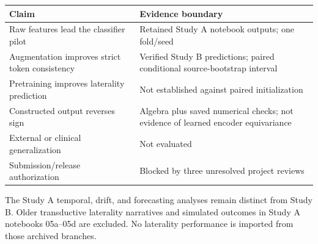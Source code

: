 \documentclass{article}
\begin{document}
{\def\LTcaptype{none} %
\begin{longtable}[]{@{}
  >{\raggedright\arraybackslash}p{}
  >{\raggedright\arraybackslash}p{}@{}}
\toprule\noalign{}
\begin{minipage}[b]{\linewidth}\raggedright
Claim
\end{minipage} & \begin{minipage}[b]{\linewidth}\raggedright
Evidence boundary
\end{minipage} \\
\midrule\noalign{}
\endhead
\bottomrule\noalign{}
\endlastfoot
Raw features lead the classifier pilot & Retained Study A notebook
outputs; one fold/seed \\
Augmentation improves strict token consistency & Verified Study B
predictions; paired conditional source-bootstrap interval \\
Pretraining improves laterality prediction & Not established against
paired initialization \\
Constructed output reverses sign & Algebra plus saved numerical checks;
not evidence of learned encoder equivariance \\
External or clinical generalization & Not evaluated \\
Submission/release authorization & Blocked by three unresolved project
reviews \\
\end{longtable}
}

The Study A temporal, drift, and forecasting analyses remain distinct
from Study B. Older transductive laterality narratives and simulated
outcomes in Study A notebooks 05a--05d are excluded. No laterality
performance is imported from those archived branches.
\clearpage
{\small


}
\end{document}
